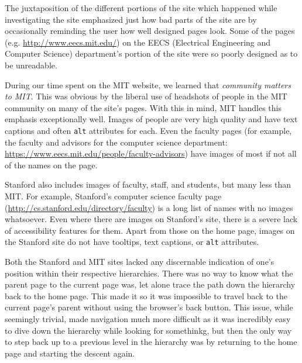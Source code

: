 The juxtaposition of the different portions of the site which happened while investigating the site emphasized just how bad parts
of the site are by occasionally reminding the user how well designed pages look. Some of the pages (e.g.
\url{http://www.eecs.mit.edu/}) on the EECS (Electrical Engineering and Computer Science) department's portion of the
site were so poorly designed as to be unreadable.

During our time spent on the MIT website, we learned that \textit{community
matters to MIT}. This was obvious by the liberal use of headshots of people in
the MIT community on many of the site's pages. With this in mind, MIT handles
this emphasis exceptionally well. Images of people are very high quality and
have text captions and often \texttt{alt} attributes for each. Even the faculty
pages (for example, the faculty and advisors for the computer science department:
\url{https://www.eecs.mit.edu/people/faculty-advisors}) have images of most if
not all of the names on the page.

Stanford also includes images of faculty, staff, and students, but many less
than MIT. For example, Stanford's computer science faculty page
(\url{http://cs.stanford.edu/directory/faculty}) is a long list of names
with no images whatsoever. Even where there are images on Stanford's site,
there is a severe lack of accessibility features for them. Apart from those
on the home page, images on the Stanford site do not have tooltips, text
captions, or \texttt{alt} attributes.

Both the Stanford and MIT sites lacked any discernable indication of one's position within their respective hierarchies.
There was no way to know what the parent page to the current page was, let alone trace the path down the hierarchy back to
the home page. This made it so it was impossible to travel back to the current page's parent without using the browser's back
button. This issue, while seemingly trivial, made navigation much more difficult as it was incredibly easy to dive down the
hierarchy while looking for somethinkg, but then the only way to step back up to a previous level in the hierarchy was by returning
to the home page and starting the descent again.